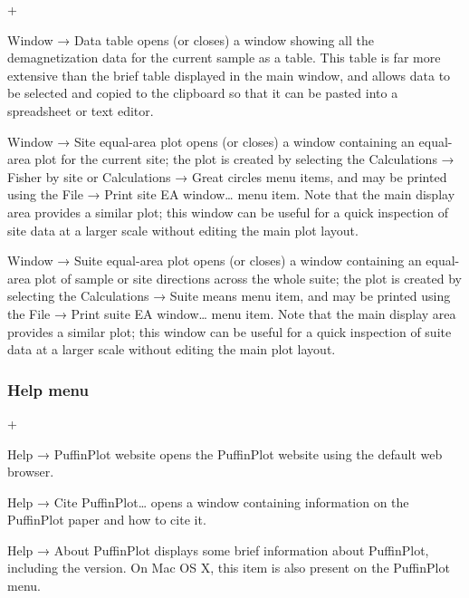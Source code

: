 \documentclass[a4paper,british]{article}
\newcommand{\menuitemlabel}[1]{%
\mbox{\textsf{#1}}\hfil}
\newenvironment{menuitemlist}%
{\begin{list}{}{%
\renewcommand{\makelabel}{\menuitemlabel}%
\setlength{\labelwidth}{35pt}%
\setlength{\leftmargin}%
             {\labelwidth+\labelsep}}}%
{\end{list}}
\newcommand{\ppcmd}[1]{\textsf{#1}} %
\newcommand{\submenu}{ \textrm{→} }
\begin{document}
\begin{menuitemlist}

\item[Window\submenu Data table] opens (or closes) a window showing
all the demagnetization data for the current sample as a table. This
table is far more extensive than the brief table displayed in the
main window, and allows data to be selected and copied to the clipboard
so that it can be pasted into a spreadsheet or text editor.

\item[Window\submenu Site equal-area plot] opens (or closes) a window
  containing an equal-area plot for the current site; the plot is created by
  selecting the \ppcmd{Calculations\submenu Fisher by site} or
  \ppcmd{Calculations\submenu Great circles} menu items, and may be printed
  using the \ppcmd{File\submenu Print site EA window\ldots} menu item. Note
  that the main display area provides a similar plot; this window can be
  useful for a quick inspection of site data at a larger scale without
  editing the main plot layout.

\item[Window\submenu Suite equal-area plot] opens (or closes) a window
  containing an equal-area plot of sample or site directions across the whole
  suite; the plot is created by selecting the \ppcmd{Calculations\submenu
    Suite means} menu item, and may be printed using the
  \ppcmd{File\submenu Print suite EA window\ldots} menu item. Note that the
  main display area provides a similar plot; this window can be useful for a
  quick inspection of suite data at a larger scale without editing the main
  plot layout.

\end{menuitemlist}

\subsubsection{Help menu}

\begin{menuitemlist}

\item[Help\submenu PuffinPlot website] opens the PuffinPlot website 
using the default web browser.

\item[Help\submenu Cite PuffinPlot\ldots] opens a window containing
information on the PuffinPlot paper \citep{lurcock2012puffinplot}
and how to cite it.

\item[Help\submenu About PuffinPlot] displays some brief information
about PuffinPlot, including the version. On Mac OS X, this item is
also present on the \ppcmd{PuffinPlot} menu.

\end{menuitemlist}
\end{document}
